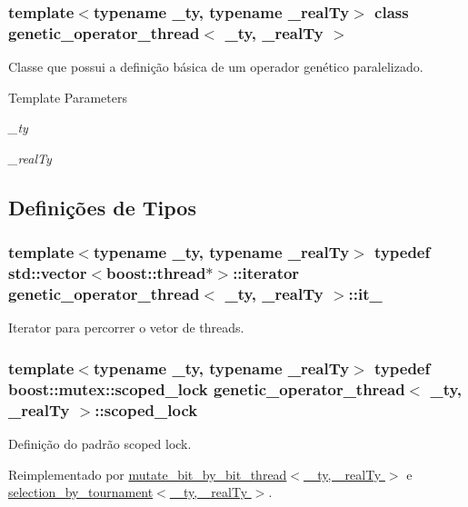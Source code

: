 \subsubsection*{template$<$typename \_\-ty, typename \_\-realTy$>$ class genetic\_\-operator\_\-thread$<$ \_\-ty, \_\-realTy $>$}

Classe que possui a definição básica de um operador genético paralelizado.


\begin{DoxyTemplParams}{Template Parameters}
\item[{\em \_\-ty}]\item[{\em \_\-realTy}]\end{DoxyTemplParams}


\subsection{Definições de Tipos}
\hypertarget{classgenetic__operator__thread_ac5a153e12dd6711746126c48edba271a}{
\subsubsection[{it\_\-}]{\setlength{\rightskip}{0pt plus 5cm}template$<$typename \_\-ty, typename \_\-realTy$>$ typedef std::vector$<$boost::thread$\ast$$>$::iterator {\bf genetic\_\-operator\_\-thread}$<$ \_\-ty, \_\-realTy $>$::{\bf it\_\-}}}
\label{classgenetic__operator__thread_ac5a153e12dd6711746126c48edba271a}
Iterator para percorrer o vetor de threads. \hypertarget{classgenetic__operator__thread_abe926f8fc2a1548516dad216a1acd4fb}{
\subsubsection[{scoped\_\-lock}]{\setlength{\rightskip}{0pt plus 5cm}template$<$typename \_\-ty, typename \_\-realTy$>$ typedef boost::mutex::scoped\_\-lock {\bf genetic\_\-operator\_\-thread}$<$ \_\-ty, \_\-realTy $>$::{\bf scoped\_\-lock}}}
\label{classgenetic__operator__thread_abe926f8fc2a1548516dad216a1acd4fb}
Definição do padrão scoped lock. 

Reimplementado por \hyperlink{classmutate__bit__by__bit__thread_a059838b054d4de64b20d33d1db7e89c0}{mutate\_\-bit\_\-by\_\-bit\_\-thread$<$ \_\-ty, \_\-realTy $>$} e \hyperlink{classselection__by__tournament_a0ba2a47db6a59696b51f19341719c3fd}{selection\_\-by\_\-tournament$<$ \_\-ty, \_\-realTy $>$}.



